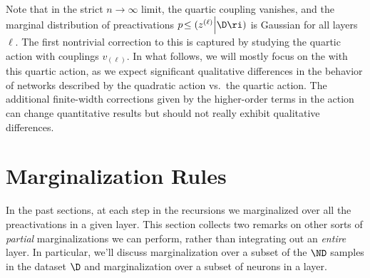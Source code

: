 Note that in the strict $n\to \infty$ limit, the quartic coupling vanishes, and the marginal distribution of preactivations $p\!\le(z^{(\ell)}\Big\vert\D\ri)$ is Gaussian for all layers $\ell$. The first nontrivial correction to this  is captured by studying the quartic action with couplings $v_{(\ell)}$. 
In what follows, we will mostly focus on the  with this quartic action, as we expect significant qualitative differences in the behavior of networks described by the quadratic action vs.~the quartic action. The additional finite-width corrections given by the higher-order terms in the action can change quantitative results but should not really exhibit qualitative differences.






\section{Marginalization Rules} 
\label{sec:sum-rule}
In the past sections, at each step in the recursions we marginalized over all the preactivations in a given layer.
This section collects two remarks on other sorts of \emph{partial} marginalizations we can perform, rather than integrating out an \emph{entire} layer. In particular, we'll discuss marginalization over a subset of the $\ND$ samples in the dataset $\D$ and marginalization over a subset of neurons in a layer. 


